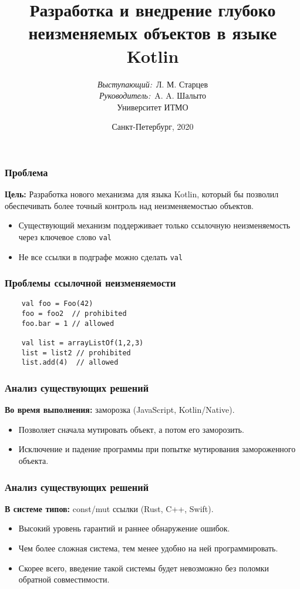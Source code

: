 \documentclass[14pt,xcolor={dvipsnames}]{beamer}
\title{\small{Разработка и внедрение глубоко неизменяемых объектов в языке Kotlin}}
\author{\small{%
\emph{Выступающий:}~Л. М. Старцев\\%
\emph{Руководитель:}~A. A. Шалыто}\\%
\vspace{30pt}%
Университет ИТМО%
\vspace{20pt}%
}
\date{\small{Санкт-Петербург, 2020}}
\begin{document}
\maketitle

\begin{frame}
\frametitle{Проблема}
\textbf{Цель:} Разработка нового механизма для языка Kotlin, который бы позволил обеспечивать более точный контроль над неизменяемостью объектов.%

\begin{itemize}
  \item Существующий механизм поддерживает только ссылочную неизменяемость через ключевое слово \texttt{val}
  \item Не все ссылки в подграфе можно сделать \texttt{val}
\end{itemize}
\end{frame}

\begin{frame}[fragile]
\frametitle{\large Проблемы ссылочной неизменяемости}
\begin{lstlisting}
	val foo = Foo(42)
	foo = foo2  // prohibited
	foo.bar = 1 // allowed
	
	val list = arrayListOf(1,2,3)
	list = list2 // prohibited
	list.add(4)  // allowed
\end{lstlisting}
\end{frame}

\begin{frame}
\frametitle{Анализ существующих решений}
\textbf{Во время выполнения:} заморозка (JavaScript, Kotlin/Native).%

\begin{itemize}
  \item Позволяет сначала мутировать объект, а потом его заморозить.
  \item Исключение и падение программы при попытке мутирования замороженного объекта.
\end{itemize}
\end{frame}

\begin{frame}
\frametitle{Анализ существующих решений}
\textbf{В системе типов:} const/mut ссылки (Rust, C++, Swift).%

\begin{itemize}
  \item Высокий уровень гарантий и раннее обнаружение ошибок.
  \item Чем более сложная система, тем менее удобно на ней программировать.
  \item Скорее всего, введение такой системы будет невозможно без поломки обратной совместимости.
\end{itemize}
\end{frame}
\end{document}
